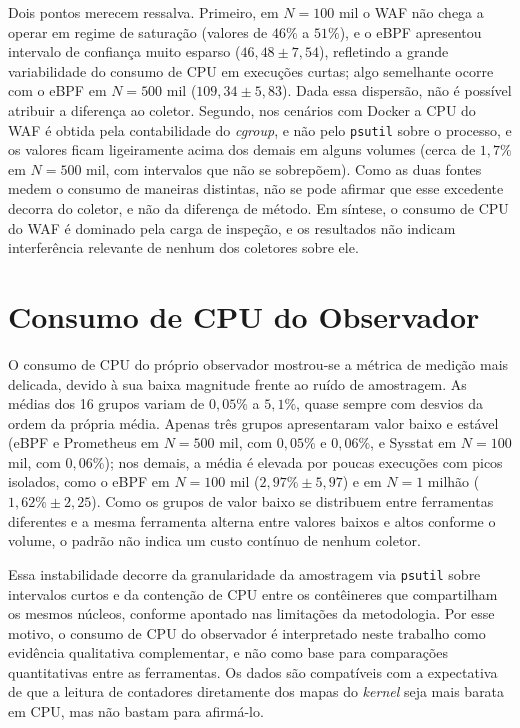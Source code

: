 Dois pontos merecem ressalva. Primeiro, em $N = 100$ mil o WAF não chega a operar em regime de saturação (valores de $46\%$ a $51\%$), e o eBPF apresentou intervalo de confiança muito esparso ($46{,}48 \pm 7{,}54$), refletindo a grande variabilidade do consumo de CPU em execuções curtas; algo semelhante ocorre com o eBPF em $N = 500$ mil ($109{,}34 \pm 5{,}83$). Dada essa dispersão, não é possível atribuir a diferença ao coletor. Segundo, nos cenários com Docker a CPU do WAF é obtida pela contabilidade do \textit{cgroup}, e não pelo \texttt{psutil} sobre o processo, e os valores ficam ligeiramente acima dos demais em alguns volumes (cerca de $1{,}7\%$ em $N = 500$ mil, com intervalos que não se sobrepõem). Como as duas fontes medem o consumo de maneiras distintas, não se pode afirmar que esse excedente decorra do coletor, e não da diferença de método. Em síntese, o consumo de CPU do WAF é dominado pela carga de inspeção, e os resultados não indicam interferência relevante de nenhum dos coletores sobre ele.

\section{Consumo de CPU do Observador}

O consumo de CPU do próprio observador mostrou-se a métrica de medição mais delicada, devido à sua baixa magnitude frente ao ruído de amostragem. As médias dos 16 grupos variam de $0{,}05\%$ a $5{,}1\%$, quase sempre com desvios da ordem da própria média. Apenas três grupos apresentaram valor baixo e estável (eBPF e Prometheus em $N = 500$ mil, com $0{,}05\%$ e $0{,}06\%$, e Sysstat em $N = 100$ mil, com $0{,}06\%$); nos demais, a média é elevada por poucas execuções com picos isolados, como o eBPF em $N = 100$ mil ($2{,}97\% \pm 5{,}97$) e em $N = 1$ milhão ($1{,}62\% \pm 2{,}25$). Como os grupos de valor baixo se distribuem entre ferramentas diferentes e a mesma ferramenta alterna entre valores baixos e altos conforme o volume, o padrão não indica um custo contínuo de nenhum coletor.

Essa instabilidade decorre da granularidade da amostragem via \texttt{psutil} sobre intervalos curtos e da contenção de CPU entre os contêineres que compartilham os mesmos núcleos, conforme apontado nas limitações da metodologia. Por esse motivo, o consumo de CPU do observador é interpretado neste trabalho como evidência qualitativa complementar, e não como base para comparações quantitativas entre as ferramentas. Os dados são compatíveis com a expectativa de que a leitura de contadores diretamente dos mapas do \textit{kernel} seja mais barata em CPU, mas não bastam para afirmá-lo.

